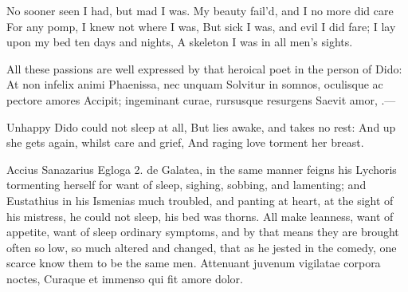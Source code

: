 No sooner seen I had, but mad I was.
My beauty fail'd, and I no more did care
For any pomp, I knew not where I was,
But sick I was, and evil I did fare;
I lay upon my bed ten days and nights,
A skeleton I was in all men's sights.

All these passions are well expressed by that heroical poet in
the person of Dido:
At non infelix animi Phaenissa, nec unquam
Solvitur in somnos, oculisque ac pectore amores
Accipit; ingeminant curae, rursusque resurgens
Saevit amor, \etc{}.---

Unhappy Dido could not sleep at all,
But lies awake, and takes no rest:
And up she gets again, whilst care and grief,
And raging love torment her breast.

Accius Sanazarius Egloga 2. de Galatea, in the same manner feigns his
Lychoris tormenting herself for want of sleep, sighing, sobbing,
and lamenting; and Eustathius in his Ismenias much troubled, and 
panting at heart, at the sight of his mistress, he could not sleep, his
bed was thorns. All make leanness, want of appetite, want of
sleep ordinary symptoms, and by that means they are brought often so
low, so much altered and changed, that as he jested in the
comedy, one scarce know them to be the same men.
Attenuant juvenum vigilatae corpora noctes,
Curaque et immenso qui fit amore dolor.

